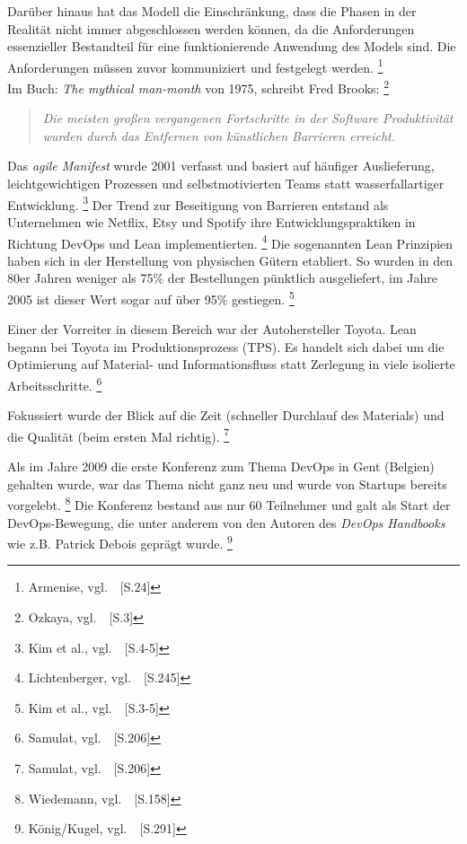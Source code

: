 Darüber hinaus hat das Modell die Einschränkung, dass die Phasen in der Realität nicht immer abgeschlossen werden können,
da die Anforderungen essenzieller Bestandteil für eine funktionierende Anwendung des Models sind.
Die Anforderungen müssen zuvor kommuniziert und festgelegt werden.
\footnote{Armenise, vgl.~\cite{Armenise2015}~[S.24]} \\

Im Buch: \textsl{The mythical man-month} von 1975, schreibt Fred Brooks: \footnote{Ozkaya, vgl.~\cite{Ozkaya2019}~[S.3]}

\begin{quotation}
    \textsl{Die meisten großen vergangenen Fortschritte in der Software Produktivität wurden durch das Entfernen von künstlichen Barrieren erreicht.}
\end{quotation}

Das \textsl{agile Manifest} wurde 2001 verfasst und basiert auf häufiger Auslieferung, leichtgewichtigen Prozessen und selbstmotivierten Teams statt wasserfallartiger Entwicklung.
\footnote{Kim et al., vgl.~\cite{Kim2018}~[S.4-5]}
Der Trend zur Beseitigung von Barrieren entstand als Unternehmen wie Netflix, Etsy und Spotify ihre Entwicklungspraktiken in Richtung DevOps und Lean implementierten.
\footnote{Lichtenberger, vgl.~\cite{Lichtenberger2017}~[S.245]}
Die sogenannten Lean Prinzipien haben sich in der Herstellung von physischen Gütern etabliert.
So wurden in den 80er Jahren weniger als 75\% der Bestellungen pünktlich ausgeliefert,
im Jahre 2005 ist dieser Wert sogar auf über 95\% gestiegen. \footnote{Kim et al., vgl.~\cite{Kim2018}~[S.3-5]}

Einer der Vorreiter in diesem Bereich war der Autohersteller Toyota.
Lean begann bei Toyota im Produktionsprozess (TPS).
Es handelt sich dabei um die Optimierung auf Material- und Informationsfluss statt Zerlegung in viele isolierte Arbeitsschritte.
\footnote{Samulat, vgl.~\cite{Samulat2017}~[S.206]}

Fokussiert wurde der Blick auf die Zeit (schneller Durchlauf des Materials) und die Qualität (beim ersten Mal richtig).
\footnote{Samulat, vgl.~\cite{Samulat2017}~[S.206]}

Als im Jahre 2009 die erste Konferenz zum Thema DevOps in Gent (Belgien) gehalten wurde,
war das Thema nicht ganz neu und wurde von Startups bereits vorgelebt. \footnote{Wiedemann, vgl.~\cite{Wiedemann2019}~[S.158]}
Die Konferenz bestand aus nur 60 Teilnehmer und galt als Start der DevOps-Bewegung,
die unter anderem von den Autoren des \textsl{DevOps Handbooks} wie z.B. Patrick Debois geprägt wurde.
\footnote{König/Kugel, vgl.~\cite{Konig2019}~[S.291]}

